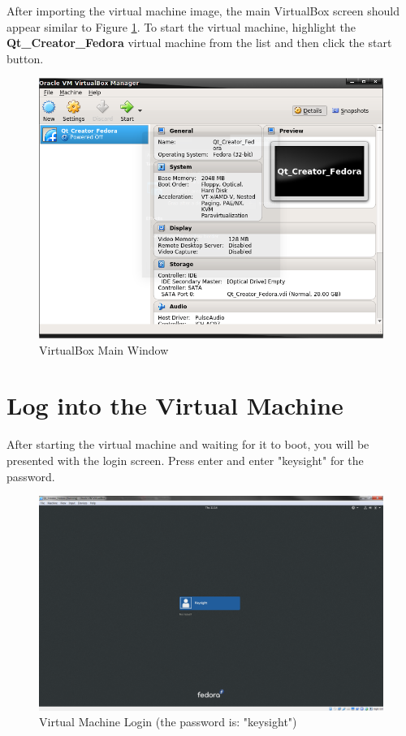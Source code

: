 \documentclass{article}
\begin{document}
After importing the virtual machine image, the main VirtualBox screen should appear similar to Figure \ref{VirtualBox_Main_Window}. To start the virtual machine, highlight the \textbf{Qt\_Creator\_Fedora} virtual machine from the list and then click the start button.

	\begin{figure}[H]
		\centering
		\includegraphics[scale=0.35]{pics/VirtualBox_Main_View.png}
		\caption{VirtualBox Main Window}
		\label{VirtualBox_Main_Window}
	\end{figure}


\section{Log into the Virtual Machine}

After starting the virtual machine and waiting for it to boot, you will be presented with the login screen. Press enter and enter "keysight" for the password.

	\begin{figure}[H]
		\centering
		\includegraphics[scale=0.25]{pics/VM_Login.png}
		\caption{Virtual Machine Login (the password is: "keysight")}
		\label{VM_login}
	\end{figure}
\end{document}
